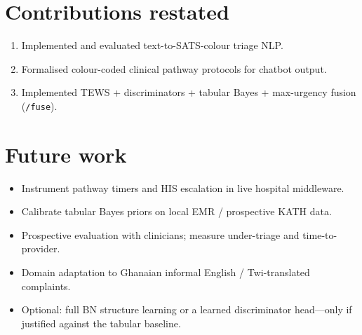 \section{Contributions restated}

\begin{enumerate}
  \item Implemented and evaluated text-to-SATS-colour triage NLP.
  \item Formalised colour-coded clinical pathway protocols for chatbot output.
  \item Implemented TEWS + discriminators + tabular Bayes + max-urgency fusion (\texttt{/fuse}).
\end{enumerate}

\section{Future work}

\begin{itemize}
  \item Instrument pathway timers and HIS escalation in live hospital middleware.
  \item Calibrate tabular Bayes priors on local EMR / prospective KATH data.
  \item Prospective evaluation with clinicians; measure under-triage and time-to-provider.
  \item Domain adaptation to Ghanaian informal English / Twi-translated complaints.
  \item Optional: full BN structure learning or a learned discriminator head---only if justified against the tabular baseline.
\end{itemize}
